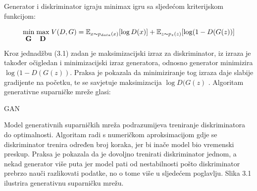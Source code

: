\documentclass[times, utf8, diplomski]{fer}
\begin{document}
Generator i diskriminator igraju minimax igru sa sljedećom kriterijskom funkcijom:

\begin{equation}
\stackunder{min}{\textbf{G}}\hspace{0.1cm}\stackunder{max}{\textbf{D}}\hspace{0.1cm} V(D,G) = \mathbb{E}_{x \thicksim p_{data}(x)}[\log D(x)] + \mathbb{E}_{z \thicksim p_z(z)}[\log (1 - D(G(z))]
\end{equation}

\pagebreak

Kroz jednadžbu (3.1) zadan je maksimizacijski izraz za diskriminator, iz izraza je također očigledan i minimizacijski izraz generatora, odnosno generator minimizira $\log (1 - D(G(z))$. Praksa je pokazala da minimiziranje tog izraza daje slabije gradijente na početku, te se savjetuje maksimizacija $\log D(G(z)$ \cite{GAN}. Algoritam generativne suparničke mreže glasi:\\

\begin{algorithm}[H]
 \caption{GAN}
\end{algorithm}

Model generativnih suparničkih mreža podrazumijeva treniranje diskriminatora do optimalnosti. Algoritam radi s numeričkom aproksimacijom gdje se diskriminator trenira određen broj koraka, jer bi inače model bio vremenski preskup. Praksa je pokazala da je dovoljno trenirati diskriminator jednom, a nekad generator više puta jer model pati od nestabilnosti pošto diskriminator prebrzo nauči razlikovati podatke, no o tome više u sljedećem poglavlju. Slika 3.1 ilustrira generativnu suparničku mrežu.
\end{document}

